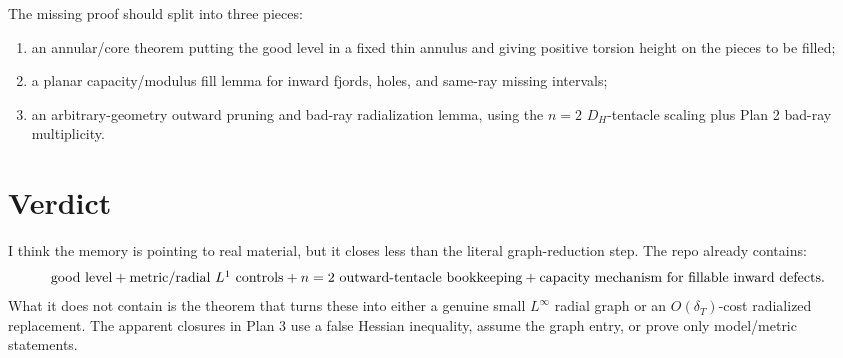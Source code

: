 \documentclass[11pt]{article}
\newcommand{\dT}{\delta_T}
\begin{document}
The missing proof should split into three pieces:
\begin{enumerate}[label=\arabic*.]
\item an annular/core theorem putting the good level in a fixed thin annulus
and giving positive torsion height on the pieces to be filled;
\item a planar capacity/modulus fill lemma for inward fjords, holes, and
same-ray missing intervals;
\item an arbitrary-geometry outward pruning and bad-ray radialization lemma,
using the \(n=2\) \(D_H\)-tentacle scaling plus Plan 2 bad-ray multiplicity.
\end{enumerate}

\section{Verdict}

I think the memory is pointing to real material, but it closes less than the
literal graph-reduction step.  The repo already contains:
\[
   \hbox{good level}
   + \hbox{metric/radial \(L^1\) controls}
   + \hbox{\(n=2\) outward-tentacle bookkeeping}
   + \hbox{capacity mechanism for fillable inward defects}.
\]
What it does not contain is the theorem that turns these into either a genuine
small \(L^\infty\) radial graph or an \(O(\dT)\)-cost radialized replacement.
The apparent closures in Plan 3 use a false Hessian inequality, assume the
graph entry, or prove only model/metric statements.
\end{document}
